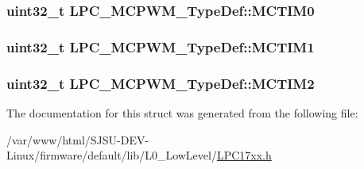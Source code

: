 \subsubsection[{\texorpdfstring{M\+C\+T\+I\+M0}{MCTIM0}}]{ uint32\+\_\+t L\+P\+C\+\_\+\+M\+C\+P\+W\+M\+\_\+\+Type\+Def\+::\+M\+C\+T\+I\+M0}\hypertarget{structLPC__MCPWM__TypeDef_a52c354973cdf330d2623a2c80d967d7e}{}\label{structLPC__MCPWM__TypeDef_a52c354973cdf330d2623a2c80d967d7e}
\subsubsection[{\texorpdfstring{M\+C\+T\+I\+M1}{MCTIM1}}]{ uint32\+\_\+t L\+P\+C\+\_\+\+M\+C\+P\+W\+M\+\_\+\+Type\+Def\+::\+M\+C\+T\+I\+M1}\hypertarget{structLPC__MCPWM__TypeDef_a3f8405e5c04f6da3f27b0cd94570fa0d}{}\label{structLPC__MCPWM__TypeDef_a3f8405e5c04f6da3f27b0cd94570fa0d}
\subsubsection[{\texorpdfstring{M\+C\+T\+I\+M2}{MCTIM2}}]{ uint32\+\_\+t L\+P\+C\+\_\+\+M\+C\+P\+W\+M\+\_\+\+Type\+Def\+::\+M\+C\+T\+I\+M2}\hypertarget{structLPC__MCPWM__TypeDef_a00588eb0e9d6752950295155f0d55a0e}{}\label{structLPC__MCPWM__TypeDef_a00588eb0e9d6752950295155f0d55a0e}


The documentation for this struct was generated from the following file\+:\begin{DoxyCompactItemize}
\item 
/var/www/html/\+S\+J\+S\+U-\/\+D\+E\+V-\/\+Linux/firmware/default/lib/\+L0\+\_\+\+Low\+Level/\hyperlink{LPC17xx_8h}{L\+P\+C17xx.\+h}\end{DoxyCompactItemize}
